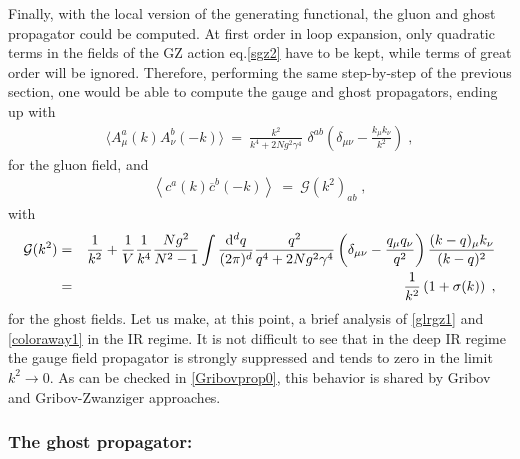 Finally, with the local version of the generating functional, the gluon and ghost propagator
could be computed. At first order in loop expansion, only quadratic terms in the fields of the
GZ action eq.\eqref{sgz2} have to be kept, while terms of great order will be ignored.
Therefore, performing the same step-by-step of the previous section, one would be able to
compute the gauge and ghost propagators, ending up with
\begin{eqnarray} 
\langle  A^a_\mu(k)  A^b_\nu(-k) \rangle  ~=~  \frac{k^2}{k^4 + 2Ng^2\gamma^4} \,\, \delta^{ab}
\left(\delta_{\mu\nu} - \frac{k_\mu k_\nu}{k^2}     \right)   \;, 
\label{glrgz1}
\end{eqnarray} 
for the gluon field, and 
\begin{eqnarray}
\left\langle  c^{a}(k) \overline{c}^{b}(-k)  \right\rangle ~=~ \mathcal G (k^2)_{ab}\;,
\end{eqnarray}
with
\begin{eqnarray}
\mathcal G (k^2) &=&
\frac{1}{k^2} + \frac{1}{V}\frac{1}{k^4} \frac{N g^2}{N^2 - 1} \int\frac{ \mathrm{d}^d q}{(2
\pi)^d} \frac{q^2}{q^4 + 2Ng^2\gamma^4} \left(\delta_{\mu\nu} - \frac{q_\mu q_\nu}{q^2}\right)
 \frac{(k-q)_\mu  k_\nu}{(k-q)^2} \nonumber\\
&=& \frac{1}{k^2}\left( 1 + \sigma(k) \right)\;,
\label{coloraway1}
\end{eqnarray}
for the ghost fields. Let us make, at this point, a brief analysis of \eqref{glrgz1} and
\eqref{coloraway1} in the IR regime. It is not difficult to see that in the deep IR regime the
gauge field propagator is strongly suppressed and tends to zero in the limit $k^2 \to 0$. As
can be checked in \eqref{Gribovprop0}, this behavior is shared by Gribov and Gribov-Zwanziger
approaches. 



\subsubsection{The ghost propagator:}

